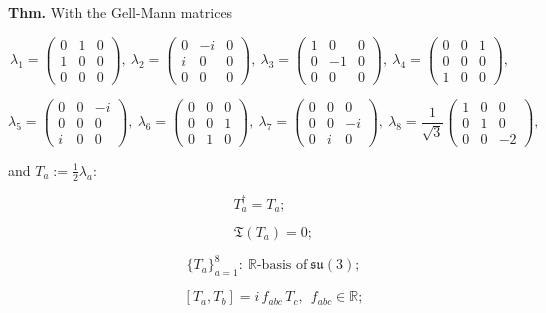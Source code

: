 \begin{theorem}\label{tag:CT3-9}
\textbf{Thm.} With the Gell-Mann matrices

\[
\lambda_1=\begin{pmatrix}0&1&0\\1&0&0\\0&0&0\end{pmatrix},\
\lambda_2=\begin{pmatrix}0&-i&0\\i&0&0\\0&0&0\end{pmatrix},\
\lambda_3=\begin{pmatrix}1&0&0\\0&-1&0\\0&0&0\end{pmatrix},\
\lambda_4=\begin{pmatrix}0&0&1\\0&0&0\\1&0&0\end{pmatrix},
\]

\[
\lambda_5=\begin{pmatrix}0&0&-i\\0&0&0\\i&0&0\end{pmatrix},\
\lambda_6=\begin{pmatrix}0&0&0\\0&0&1\\0&1&0\end{pmatrix},\
\lambda_7=\begin{pmatrix}0&0&0\\0&0&-i\\0&i&0\end{pmatrix},\
\lambda_8=\frac1{\sqrt3}\begin{pmatrix}1&0&0\\0&1&0\\0&0&-2\end{pmatrix},
\]

and $T_a:=\tfrac12\lambda_a$:

\[
T_a^\dagger=T_a;
\]

\[
\qquad \mathfrak T(T_a)=0;
\]

\[
\qquad \{T_a\}_{a=1}^{8}:\ \mathbb R\text{-basis of}\ \mathfrak{su}(3);
\]

\[
\qquad [T_a,T_b]=i\,f_{abc}\,T_c,\ \ f_{abc}\in\mathbb R;
\]


\end{theorem}
